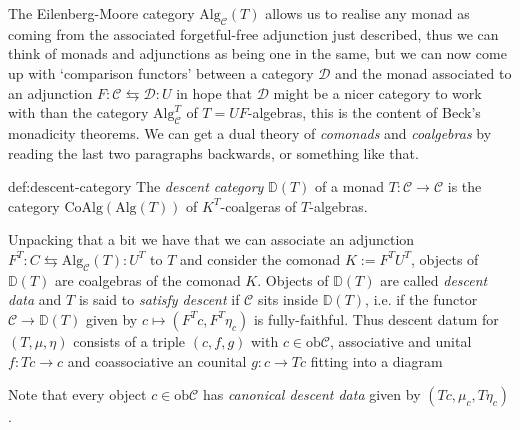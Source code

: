 The Eilenberg-Moore category $\text{Alg}_\mathcal{C}(T)$ allows us to realise any monad as coming from the associated forgetful-free adjunction just described, thus we can think of monads and adjunctions as being one in the same, but we can now come up with `comparison functors' between a category $\mathcal{D}$ and the monad associated to an adjunction $F : \mathcal{C} \leftrightarrows \mathcal{D} : U$ in hope that $\mathcal{D}$ might be a nicer category to work with than the category $\text{Alg}_\mathcal{C}^T$ of $T = UF$-algebras, this is the content of Beck's monadicity theorems. We can get a dual theory of \textit{comonads} and \textit{coalgebras} by reading the last two paragraphs backwards, or something like that.

\begin{definition}{def:descent-category}
The \textit{descent category} $\mathbb{D}(T)$ of a monad $T : \mathcal{C} \to \mathcal{C}$ is the category $\text{CoAlg}(\text{Alg}(T))$ of $K^T$-coalgeras of $T$-algebras.
\end{definition}

Unpacking that a bit we have that we can associate an adjunction $F^T : C \leftrightarrows \text{Alg}_\mathcal{C}(T) : U^T$ to $T$ and consider the comonad $K := F^TU^T$, objects of $\mathbb{D}(T)$ are coalgebras of the comonad $K$. Objects of $\mathbb{D}(T)$ are called \textit{descent data} and $T$ is said to \textit{satisfy descent} if $\mathcal{C}$ sits inside $\mathbb{D}(T)$, i.e. if the functor $\mathcal{C} \to \mathbb{D}(T)$ given by $c \mapsto (F^Tc, F^T\eta_c)$ is fully-faithful. Thus descent datum for $(T, \mu, \eta)$ consists of a triple $(c,f,g)$ with $c \in \text{ob}\mathcal{C}$, associative and unital $f : Tc \to c$ and coassociative an counital $g : c \to Tc$ fitting into a diagram
	\begin{figure}[ht!]
	\centering
	\end{figure}
\vspace{-5ex} 

Note that every object $c \in \text{ob}\mathcal{C}$ has \textit{canonical descent data} given by $(Tc,\mu_c,T\eta_c)$.

